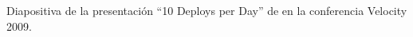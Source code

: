 \label{fig:devheartops}
\captionStyle Diapositiva de la presentación ``10 Deploys per Day''
  de \citeauthor{flickr} en la conferencia Velocity 2009.
